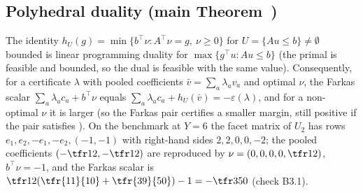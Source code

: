 \subsection{Polyhedral duality (main Theorem~)}
The identity $h_U(g)=\min\{b^\top\nu:A^\top\nu=g,\ \nu\ge0\}$ for $U=\{Au\le b\}\neq\emptyset$ bounded is linear programming duality for $\max\{g^\top u:Au\le b\}$ (the primal is feasible and bounded, so the dual is feasible with the same value). Consequently, for a certificate $\lambda$ with pooled coefficients $\bar v=\sum_a\lambda_av_a$ and optimal $\nu$, the Farkas scalar $\sum_a\lambda_ac_a+b^\top\nu$ equals $\sum_a\lambda_ac_a+h_U(\bar v)=-\varepsilon(\lambda)$, and for a non-optimal $\nu$ it is larger (so the Farkas pair certifies a smaller margin, still positive if the pair satisfies ). On the benchmark at $Y=6$ the facet matrix of $U_2$ has rows $e_1,e_2,-e_1,-e_2,(-1,-1)$ with right-hand sides $2,2,0,0,-2$; the pooled coefficients $(-\tfr12,-\tfr12)$ are reproduced by $\nu=(0,0,0,0,\tfr12)$, $b^\top\nu=-1$, and the Farkas scalar is $\tfr12(\tfr{11}{10}+\tfr{39}{50})-1=-\tfr3{50}$ (check B3.1).

